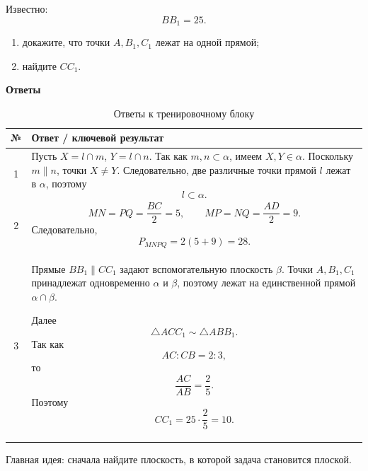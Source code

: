 \documentclass[a4paper,12pt]{article}
\begin{document}
Известно:
\[
BB_1=25.
\]

\begin{enumerate}[label=\alph*),leftmargin=8mm,itemsep=2mm]
  \item докажите, что точки \(A,B_1,C_1\) лежат на одной прямой;
  \item найдите \(CC_1\).
\end{enumerate}

\clearpage
\thispagestyle{plain}

\begin{center}
{\LARGE\bfseries\color{darkaccent}Ответы}
\end{center}

\vspace{8mm}

\renewcommand{\arraystretch}{1.35}

\begin{table}[ht]
\centering
\caption{Ответы к тренировочному блоку}
\begin{tabularx}{\linewidth}{@{}cX@{}}
\toprule
\textbf{№} & \textbf{Ответ / ключевой результат} \\
\midrule

1 &
Пусть \(X=l\cap m\), \(Y=l\cap n\).
Так как \(m,n\subset\alpha\), имеем \(X,Y\in\alpha\).
Поскольку \(m\parallel n\), точки \(X\ne Y\).
Следовательно, две различные точки прямой \(l\) лежат в \(\alpha\), поэтому
\[
l\subset\alpha.
\]
\\

\addlinespace

2 &
\[
MN=PQ=\frac{BC}{2}=5,
\qquad
MP=NQ=\frac{AD}{2}=9.
\]
Следовательно,
\[
P_{MNPQ}=2(5+9)=\boxed{28}.
\]
\\

\addlinespace

3 &
Прямые \(BB_1\parallel CC_1\) задают вспомогательную плоскость \(\beta\).
Точки \(A,B_1,C_1\) принадлежат одновременно \(\alpha\) и \(\beta\), поэтому
лежат на единственной прямой \(\alpha\cap\beta\).

Далее
\[
\triangle ACC_1\sim\triangle ABB_1.
\]
Так как
\[
AC:CB=2:3,
\]
то
\[
\frac{AC}{AB}=\frac{2}{5}.
\]
Поэтому
\[
CC_1
=
25\cdot\frac25
=
\boxed{10}.
\]
\\

\bottomrule
\end{tabularx}
\end{table}

\vfill

\begin{center}
{\small\color{softgray}
Главная идея: сначала найдите плоскость, в которой задача становится плоской.}
\end{center}
\end{document}
